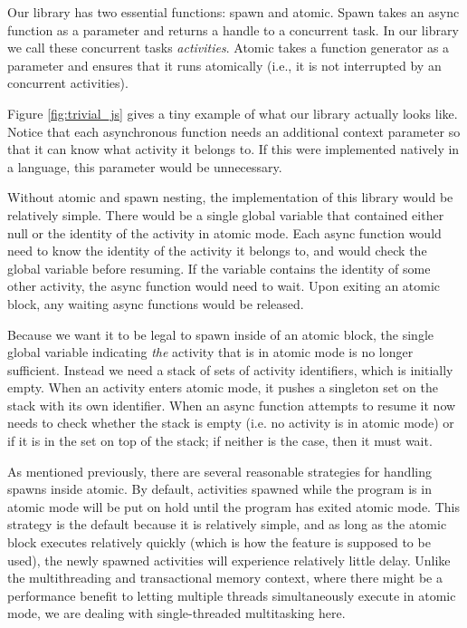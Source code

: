 \documentclass[sigplan,10pt,review,anonymous]{acmart}\settopmatter{printfolios=true,printccs=false,printacmref=false}
\begin{document}
Our library has two essential functions: spawn and atomic.
Spawn takes an async function as a parameter and returns a handle to a concurrent task.
In our library we call these concurrent tasks \emph{activities}.
Atomic takes a function generator as a parameter and ensures that it runs atomically (i.e., it is not interrupted by an concurrent activities).

Figure \ref{fig:trivial_js} gives a tiny example of what our library actually looks like.
Notice that each asynchronous function needs an additional context parameter so that it can know what activity it belongs to.
If this were implemented natively in a language, this parameter would be unnecessary.

Without atomic and spawn nesting, the implementation of this library would be relatively simple.
There would be a single global variable that contained either null or the identity of the activity in atomic mode.
Each async function would need to know the identity of the activity it belongs to, and would check the global variable before resuming.
If the variable contains the identity of some other activity, the async function would need to wait.
Upon exiting an atomic block, any waiting async functions would be released.

Because we want it to be legal to spawn inside of an atomic block, the single global variable indicating \emph{the} activity that is in atomic mode is no longer sufficient.
Instead we need a stack of sets of activity identifiers, which is initially empty.
When an activity enters atomic mode, it pushes a singleton set on the stack with its own identifier.
When an async function attempts to resume it now needs to check whether the stack is empty (i.e. no activity is in atomic mode) or if it is in the set on top of the stack; if neither is the case, then it must wait.

As mentioned previously, there are several reasonable strategies for handling spawns inside atomic.
By default, activities spawned while the program is in atomic mode will be put on hold until the program has exited atomic mode.
This strategy is the default because it is relatively simple, and as long as the atomic block executes relatively quickly (which is how the feature is supposed to be used), the newly spawned activities will experience relatively little delay.
Unlike the multithreading and transactional memory context, where there might be a performance benefit to letting multiple threads simultaneously execute in atomic mode, we are dealing with single-threaded multitasking here.
\end{document}
